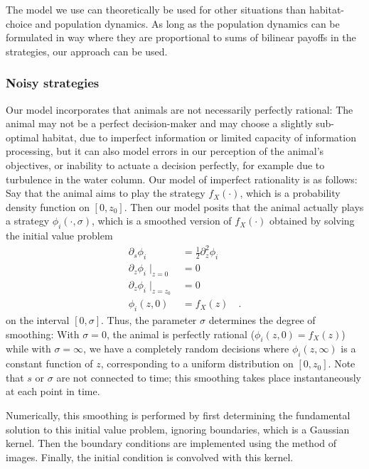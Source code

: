 The model we use can theoretically be used for other situations than habitat-choice and population dynamics. As long as the population dynamics can be formulated in way where they are proportional to sums of bilinear payoffs in the strategies, our approach can be used.



\subsubsection{Noisy strategies}
Our model incorporates that animals are not necessarily perfectly rational: The animal may not be a perfect decision-maker and may choose a slightly sub-optimal habitat, due to imperfect information or limited capacity of information processing, but it can also model errors in our perception of the animal's objectives, or inability to actuate a decision perfectly, for example due to turbulence in the water column. Our model of imperfect rationality is as follows: Say that the animal aims to play the strategy $f_X(\cdot)$, which is a probability density function on $[0,z_0]$. Then our model posits that the animal actually plays a strategy $\phi_i(\cdot ,\sigma)$, which is a smoothed version of $f_X(\cdot)$ obtained by solving the initial value problem
\begin{equation}
  \begin{split}
  \label{eq:density_PDE}
  \partial_s \phi_i &= \frac{1}{2}\partial_z^2 \phi_i \\
  \partial_z \phi_i \mid_{z=0} &= 0 \\
  \partial_z \phi_i \mid_{z = z_0} &= 0 \\
   \phi_i(z,0) &= f_X(z) \quad .
 \end{split}
\end{equation}
on the interval $[0,\sigma]$. Thus, the parameter $\sigma$ determines the degree of smoothing: With $\sigma=0$, the animal is perfectly rational ($\phi_i(z,0)=f_X(z)$) while with $\sigma=\infty$, we have a completely random decisions where $\phi_i(z,\infty)$ is a constant function of $z$, corresponding to a uniform distribution on $[0,z_0]$. Note that $s$ or $\sigma$ are not connected to time; this smoothing takes place instantaneously at each point in time.

Numerically, this smoothing is performed by first determining the fundamental solution to this initial value problem, ignoring boundaries, which is a Gaussian kernel. Then the boundary conditions are implemented using the method of images. Finally, the initial condition is convolved with this kernel.


